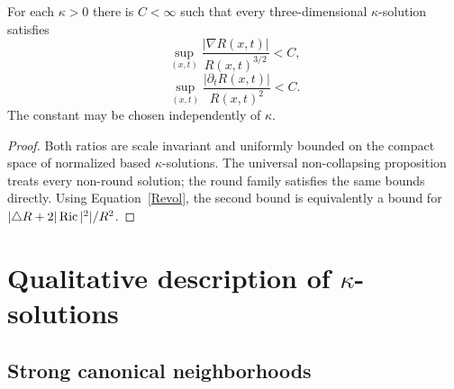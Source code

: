 \begin{corollary}\label{cor:curvature-derivative-bounds-universal}
\label{derivcor}

For each $\kappa>0$ there is $C<\infty$ such that every
three-dimensional $\kappa$-solution satisfies
\begin{equation}\label{gradest}
 \sup_{(x,t)}\frac{|\nabla R(x,t)|}{R(x,t)^{3/2}}<C,
\end{equation}
\begin{equation}\label{timeest}
 \sup_{(x,t)}\frac{|\partial_tR(x,t)|}{R(x,t)^2}<C.
\end{equation}
The constant may be chosen independently of $\kappa$.
\end{corollary}
\begin{proof}
\sketch
{}
Both ratios are scale invariant and uniformly bounded on the compact
space of normalized based $\kappa$-solutions. The universal
non-collapsing proposition treats every non-round solution; the
round family satisfies the same bounds directly. Using
Equation~\ref{Revol}, the second bound is equivalently a bound for
$|\triangle R+2|\operatorname{Ric}|^2|/R^2$.
\end{proof}

\section{Qualitative description of $\kappa$-solutions}

\subsection{Strong canonical neighborhoods}

